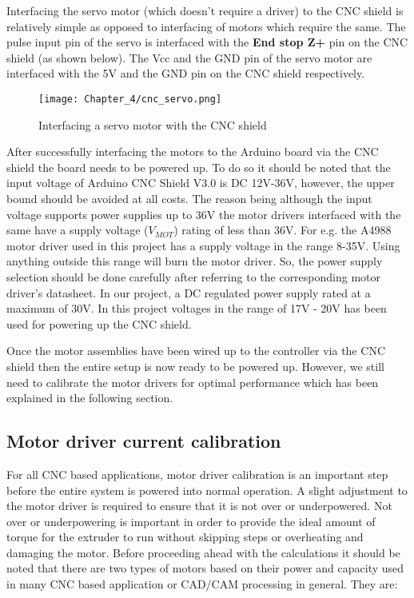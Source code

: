 Interfacing the servo motor (which doesn’t require a driver) to the CNC shield is relatively simple as opposed to interfacing of motors which require the same. The pulse input pin of the servo is interfaced with the \textbf{End stop Z+} pin on the CNC shield (as shown below). The Vcc and the GND pin of the servo motor are interfaced with the 5V and the GND pin on the CNC shield respectively. \par

\begin{figure}[h]
 \centering
 \texttt{[image: Chapter\_4/cnc\_servo.png]}
 \caption{Interfacing a servo motor with the CNC shield}
 \label{fig:cnc_servo}
\end{figure}

After successfully interfacing the motors to the Arduino board via the CNC shield the board needs to be powered up. To do so it should be noted that the input voltage of Arduino CNC Shield V3.0 is DC 12V-36V, however, the upper bound should be avoided at all costs. The reason being although the input voltage supports power supplies up to 36V the motor drivers interfaced with the same have a supply voltage ($V_{MOT}$) rating of less than 36V. For e.g. the A4988 motor driver used in this project has a supply voltage in the range 8-35V. Using anything outside this range will burn the motor driver. So, the power supply selection should be done carefully after referring to the corresponding motor driver’s datasheet. In our project, a DC regulated power supply rated at a maximum of 30V. In this project voltages in the range of 17V - 20V has been used for powering up the CNC shield. \par

Once the motor assemblies have been wired up to the controller via the CNC shield then the entire setup is now ready to be powered up. However, we still need to calibrate the motor drivers for optimal performance which has been explained in the following section.


\subsection{Motor driver current calibration}

For all CNC based applications, motor driver calibration is an important step before the entire system is powered into normal operation. A slight adjustment to the motor driver is required to ensure that it is not over or underpowered. Not over or underpowering is important in order to provide the ideal amount of torque for the extruder to run without skipping steps or overheating and damaging the motor. Before proceeding ahead with the calculations it should be noted that there are two types of motors based on their power and capacity used in many CNC based application or CAD/CAM processing in general. They are:

